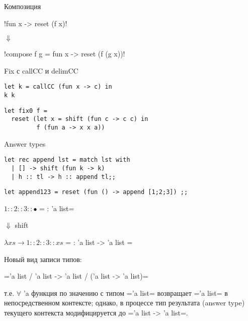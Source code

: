 \documentclass{beamer}
\begin{document}
\begin{frame}[fragile]{Композиция}
\begin{center}
\camline!fun x -> reset (f x)!

{\Large $\Downarrow$ }

\camline!compose f g  = fun x -> reset (f (g x))!
\end{center}
\end{frame}

\begin{frame}[fragile]{Fix с callCC и delimCC}

\begin{center}
\begin{lstlisting}[style={camlstyle1}]
let k = callCC (fun x -> c) in 
k k
\end{lstlisting}

\begin{lstlisting}[style={camlstyle1}]
let fix0 f =
  reset (let x = shift (fun c -> c c) in
         f (fun a -> x x a))
\end{lstlisting}
\end{center}
\end{frame}


\begin{frame}[fragile]{Answer types}
\begin{lstlisting}[style={camlstyle1}]
let rec append lst = match lst with 
  | [] -> shift (fun k -> k)
  | h :: tl -> h :: append tl;;
\end{lstlisting}
\begin{lstlisting}[style={camlstyle1}]
let append123 = reset (fun () -> append [1;2;3]) ;;
\end{lstlisting}
\noindent\makebox[\linewidth]{\rule{\paperwidth}{0.4pt}}
\begin{center}
$ 1 :: 2 :: 3 :: \bullet$  \camline=  : 'a list=

$\Downarrow$ shift

$\lambda x\!s \rightarrow 1 :: 2 :: 3 :: x\!s$ \camline=  : 'a list -> 'a list =
\end{center}
Новый вид записи типов:

\camline='a list / 'a list -> 'a list / ('a list -> 'a list)= 
\vspace{0.5cm}

т.е. $\forall$ 'a функция по значению с типом \camline='a list= возвращает \camline='a list= в непосредственном контексте; однако, в процессе тип результата (answer type)  текущего контекста модифицируется до \camline='a list -> 'a list=.

\end{frame}
\end{document}
